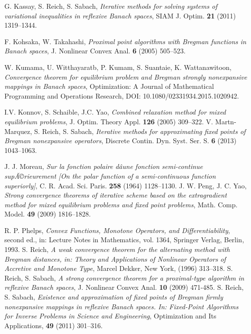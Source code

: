 \documentclass[reqno,b5paper]{amsart}
\theoremstyle{plain}
\theoremstyle{definition}
\numberwithin{equation}{section}
\numberwithin{equation}{section}
\begin{document}
\begin{thebibliography}{99}
G. Kassay,  S. Reich, S. Sabach, \textit{Iterative methods for solving systems of variational inequalities
in reflexive Banach spaces}, SIAM J. Optim.  \textbf{21}  (2011) 1319--1344.

F. Kohsaka, W. Takahashi, \textit{Proximal point algorithms with Bregman functions in Banach spaces}, J. Nonlinear Convex Anal. \textbf{6} (2005) 505--523.

W. Kumama, U. Witthayaratb, P. Kumam,
S. Suantaie, K. Wattanawitoon, \textit{
Convergence theorem for equilibrium problem and Bregman strongly
nonexpansive mappings in Banach spaces}, Optimization: A Journal of Mathematical
Programming and Operations Research, DOI: 10.1080/02331934.2015.1020942.

I.V. Konnov, S. Schaible, J.C. Yao, \textit{Combined relaxation method for mixed equilibrium problems}, J. Optim. Theory Appl. \textbf{126} (2005) 309--322.
V. Martn-Marquez, S. Reich, S. Sabach, \textit{Iterative methods for approximating fixed points of
Bregman nonexpansive operators}, Discrete Contin. Dyn. Syst. Ser. S. \textbf{6} (2013) 1043--1063.

J. J. Moreau, \textit{  Sur la fonction polaire dâune fonction semi-continue supÃ©rieurement [On the polar
function of a semi-continuous function superiorly]},  C. R. Acad. Sci. Paris. \textbf{258} (1964) 1128--1130.
J. W. Peng, J. C. Yao, \textit{Strong convergence theorems of iterative scheme based on the
extragradient method for mixed equilibrium problems and fixed
point problems}, Math. Comp. Model. \textbf{49} (2009) 1816--1828.


R. P. Phelps, \textit{Convex Functions, Monotone Operators, and Differentiability}, second ed., in: Lecture Notes in Mathematics, vol.
1364, Springer Verlag, Berlin, 1993.
S. Reich, \textit{A weak convergence theorem for the alternating method with Bregman distances, in: Theory and Applications of
Nonlinear Operators of Accretive and Monotone Type}, Marcel Dekker, New York, (1996) 313--318.
S. Reich, S. Sabach, \textit{A strong convergence theorem for a proximal-type algorithm in reflexive Banach spaces},
J. Nonlinear Convex Anal. \textbf{10} (2009) 471-485.
S. Reich, S. Sabach, \textit{Existence and approximation of fixed points of Bregman firmly nonexpansive mappings in
reflexive Banach spaces. In: Fixed-Point Algorithms for Inverse Problems in Science and Engineering}, Optimization and Its Applications, 
\textbf{49} (2011) 301--316.


\end{thebibliography}
\end{document}
